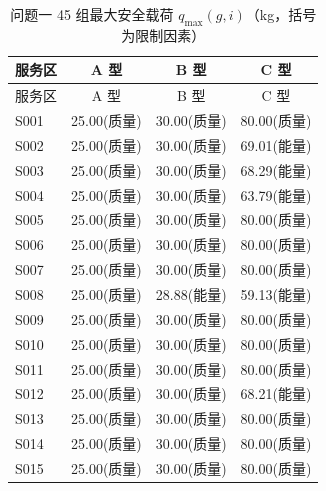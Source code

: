 \begin{center}\small\renewcommand{\arraystretch}{1.05}
\begin{longtable}{lccc}
\caption{问题一 45 组最大安全载荷 $q_{\max}(g,i)$（kg，括号为限制因素）}\label{tab:q1_qmax_all}\\
\hline 服务区 & A 型 & B 型 & C 型 \\\hline\endfirsthead
\hline 服务区 & A 型 & B 型 & C 型 \\\hline\endhead
S001 & 25.00(质量) & 30.00(质量) & 80.00(质量) \\
S002 & 25.00(质量) & 30.00(质量) & 69.01(能量) \\
S003 & 25.00(质量) & 30.00(质量) & 68.29(能量) \\
S004 & 25.00(质量) & 30.00(质量) & 63.79(能量) \\
S005 & 25.00(质量) & 30.00(质量) & 80.00(质量) \\
S006 & 25.00(质量) & 30.00(质量) & 80.00(质量) \\
S007 & 25.00(质量) & 30.00(质量) & 80.00(质量) \\
S008 & 25.00(质量) & 28.88(能量) & 59.13(能量) \\
S009 & 25.00(质量) & 30.00(质量) & 80.00(质量) \\
S010 & 25.00(质量) & 30.00(质量) & 80.00(质量) \\
S011 & 25.00(质量) & 30.00(质量) & 80.00(质量) \\
S012 & 25.00(质量) & 30.00(质量) & 68.21(能量) \\
S013 & 25.00(质量) & 30.00(质量) & 80.00(质量) \\
S014 & 25.00(质量) & 30.00(质量) & 80.00(质量) \\
S015 & 25.00(质量) & 30.00(质量) & 80.00(质量) \\
\hline\end{longtable}\end{center}
